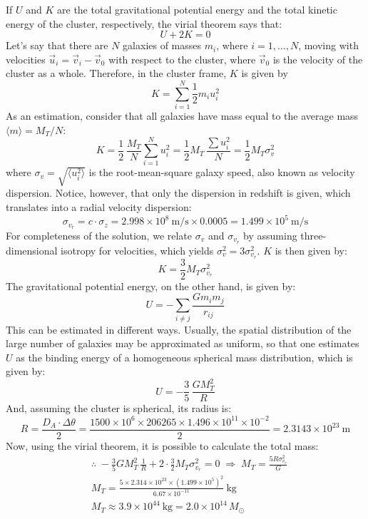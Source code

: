 If $U$ and $K$ are the total gravitational potential energy and the total
kinetic energy of the cluster, respectively, the virial theorem says that:
\begin{equation*}
U + 2K = 0
\tag*{(2.0)}
\end{equation*}
Let's say that there are $N$ galaxies of masses $m_i$, where $i = 1,\dots,N$,
moving with velocities $\vec{u}_i = \vec{v}_i - \vec{v}_0$ with respect to the
cluster, where $\vec{v}_0$ is the velocity of the cluster as a whole.
Therefore, in the cluster frame, $K$ is given by
\[
K = \sum_{i=1}^{N} \frac{1}{2} m_i u_i^2
\]
As an estimation, consider that all galaxies have mass equal to the average
mass $\langle m \rangle = M_T/N$:
\begin{equation*}
K = \frac{1}{2}\,\frac{M_T}{N} \sum_{i=1}^{N} u_i^2
= \frac{1}{2} M_T\,\frac{\sum u_i^2}{N}
= \frac{1}{2} M_T \sigma_v^2
\tag*{(2.0)}
\end{equation*}
where $\sigma_v = \sqrt{\langle u_i^2 \rangle}$ is the root-mean-square galaxy
speed, also known as velocity dispersion. Notice, however, that only the
dispersion in redshift is given, which translates into a radial velocity
dispersion:
\begin{equation*}
\sigma_{v_r} = c \cdot \sigma_z
= 2.998 \times 10^{8}~\mathrm{m/s} \times 0.0005
= 1.499 \times 10^{5}~\mathrm{m/s}
\tag*{(1.0)}
\end{equation*}
For completeness of the solution, we relate $\sigma_v$ and $\sigma_{v_r}$ by
assuming three-dimensional isotropy for velocities, which yields
$\sigma_v^2 = 3\sigma_{v_r}^2$. $K$ is then given by:
\[
K = \frac{3}{2} M_T \sigma_{v_r}^2
\]
The gravitational potential energy, on the other hand, is given by:
\[
U = -\sum_{i \neq j} \frac{G m_i m_j}{r_{ij}}
\]
This can be estimated in different ways. Usually, the spatial distribution of
the large number of galaxies may be approximated as uniform, so that one
estimates $U$ as the binding energy of a homogeneous spherical mass
distribution, which is given by:
\begin{equation*}
U = -\frac{3}{5}\,\frac{G M_T^2}{R}
\tag*{(2.0)}
\end{equation*}
And, assuming the cluster is spherical, its radius is:
\begin{equation*}
R = \frac{D_A \cdot \Delta\theta}{2}
= \frac{1500 \times 10^{6} \times 206265 \times 1.496 \times 10^{11}
        \times 10^{-2}}{2}
= 2.3143 \times 10^{23}~\mathrm{m}
\tag*{(1.0)}
\end{equation*}
Now, using the virial theorem, it is possible to calculate the total mass:
\begin{align*}
&\therefore\;
-\frac{3}{5} G M_T^2\,\frac{1}{R} + 2 \cdot \frac{3}{2} M_T \sigma_{v_r}^2 = 0
\;\Rightarrow\;
M_T = \frac{5 R \sigma_{v_r}^2}{G} \\
&M_T = \frac{5 \times 2.314 \times 10^{23}
             \times (1.499 \times 10^{5})^2}{6.67 \times 10^{-11}}~\mathrm{kg}
\\
&M_T \approx 3.9 \times 10^{44}~\mathrm{kg} = 2.0 \times 10^{14}\,M_\odot
\tag*{(2.0)}
\end{align*}

